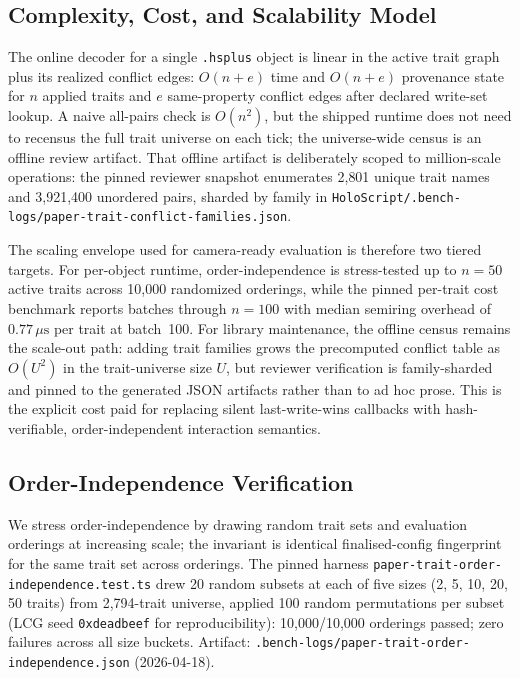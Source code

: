 \documentclass[sigconf,nonacm]{acmart}
\newcommand{\hsplus}{\texttt{.hsplus}}
\begin{document}
\subsection{Complexity, Cost, and Scalability Model}
\label{sec:paper11-cost-scaling}

The online decoder for a single \hsplus{} object is linear in the active
trait graph plus its realized conflict edges: $O(n + e)$ time and
$O(n + e)$ provenance state for $n$ applied traits and $e$ same-property
conflict edges after declared write-set lookup. A naive all-pairs check is
$O(n^2)$, but the shipped runtime does not need to recensus the full trait
universe on each tick; the universe-wide census is an offline review
artifact. That offline artifact is deliberately scoped to million-scale
operations: the pinned reviewer snapshot enumerates 2{,}801 unique trait
names and 3{,}921{,}400 unordered pairs, sharded by family in
\texttt{HoloScript/.bench-logs/paper-trait-conflict-families.json}.

The scaling envelope used for camera-ready evaluation is therefore two
tiered targets. For per-object runtime, order-independence is stress-tested
up to $n=50$ active traits across 10{,}000 randomized orderings, while the
pinned per-trait cost benchmark reports batches through $n=100$ with median
semiring overhead of $0.77\,\mu\text{s}$ per trait at batch~100. For
library maintenance, the offline census remains the scale-out path:
adding trait families grows the precomputed conflict table as
$O(U^2)$ in the trait-universe size $U$, but reviewer verification is
family-sharded and pinned to the generated JSON artifacts rather than to
ad hoc prose. This is the explicit cost paid for replacing silent
last-write-wins callbacks with hash-verifiable, order-independent
interaction semantics.

\subsection{Order-Independence Verification}
\label{sec:order-independence-experiment}

We stress order-independence by drawing random trait sets and
evaluation orderings at increasing scale; the invariant is identical
finalised-config fingerprint for the same trait set across orderings.
The pinned harness \texttt{paper-trait-order-independence.test.ts} drew
20 random subsets at each of five sizes (2, 5, 10, 20, 50 traits) from
2{,}794-trait universe, applied 100 random permutations per subset (LCG
seed \texttt{0xdeadbeef} for reproducibility):
10{,}000/10{,}000 orderings passed; zero failures across all size
buckets.
Artifact: \texttt{.bench-logs/paper-trait-order-independence.json}
(2026-04-18).
\end{document}
